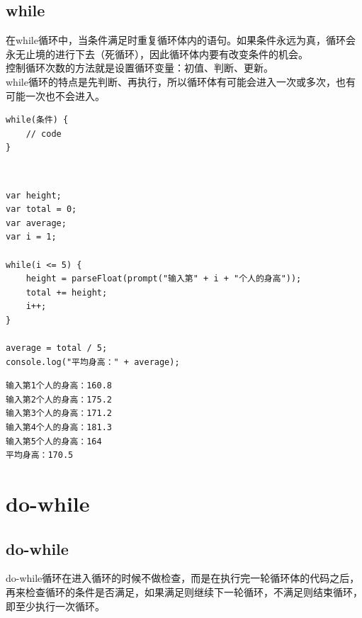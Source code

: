 \subsection{while}

在while循环中，当条件满足时重复循环体内的语句。如果条件永远为真，循环会永无止境的进行下去（死循环），因此循环体内要有改变条件的机会。 \\

控制循环次数的方法就是设置循环变量：初值、判断、更新。 \\

while循环的特点是先判断、再执行，所以循环体有可能会进入一次或多次，也有可能一次也不会进入。 \\

\begin{lstlisting}[style=htmlcssjs]
while(条件) {
    // code
}
\end{lstlisting}

\vspace{0.5cm}

 \\

\begin{lstlisting}[style=htmlcssjs]
var height;
var total = 0;
var average;
var i = 1;

while(i <= 5) {
    height = parseFloat(prompt("输入第" + i + "个人的身高"));
    total += height;
    i++;
}

average = total / 5;
console.log("平均身高：" + average);
\end{lstlisting}

\begin{tcolorbox}
	\begin{verbatim}
输入第1个人的身高：160.8
输入第2个人的身高：175.2
输入第3个人的身高：171.2
输入第4个人的身高：181.3
输入第5个人的身高：164
平均身高：170.5
	\end{verbatim}
\end{tcolorbox}

\newpage

\section{do-while}

\subsection{do-while}

do-while循环在进入循环的时候不做检查，而是在执行完一轮循环体的代码之后，再来检查循环的条件是否满足，如果满足则继续下一轮循环，不满足则结束循环，即至少执行一次循环。 \\

